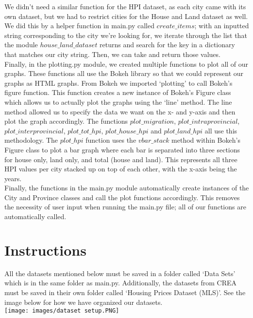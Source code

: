 \documentclass[fontsize=11pt]{article}
\begin{document}
We didn’t need a similar function for the HPI dataset, as each city came with its own dataset, but we had to restrict cities for the House and Land dataset as well. We did this by a helper function in main.py called $create\_items$; with an inputted string corresponding to the city we’re looking for, we iterate through the list that the module $house\_land\_dataset$ returns and search for the key in a dictionary that matches our city string. Then, we can take and return those values. \\

Finally, in the plotting.py module, we created multiple functions to plot all of our graphs. These functions all use the Bokeh library so that we could represent our graphs as HTML graphs. From Bokeh we imported ‘plotting’ to call Bokeh’s figure function. This function creates a new instance of Bokeh’s Figure class which allows us to actually plot the graphs using the ‘line’ method. The line method allowed us to specify the data we want on the x- and y-axis and then plot the graph accordingly. The functions $plot\_migration$, $plot\_intraprovincial$, $plot\_interprovincial$, $plot\_tot\_hpi$, $plot\_house\_hpi$ and $plot\_land\_hpi$ all use this methodology. The $plot\_hpi$ function uses the $vbar\_stack$ method within Bokeh’s Figure class to plot a bar graph where each bar is separated into three sections for house only, land only, and total (house and land). This represents all three HPI values per city stacked up on top of each other, with the x-axis being the years. \\

Finally, the functions in the main.py module automatically create instances of the City and Province classes and call the plot functions accordingly. This removes the necessity of user input when running the main.py file; all of our functions are automatically called.

\newpage

\section{Instructions}

All the datasets mentioned below must be saved in a folder called ‘Data Sets’ which is in the same folder as main.py. Additionally, the datasets from CREA must be saved in their own folder called ‘Housing Prices Dataset (MLS)’. See the image below for how we have organized our datasets. \\

\texttt{[image: images/dataset setup.PNG]}
\end{document}
